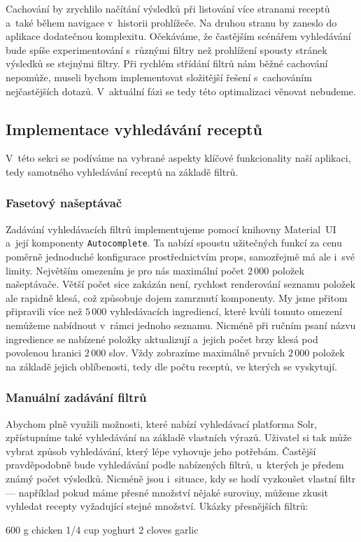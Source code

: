 Cachování by zrychlilo načítání výsledků při listování více stranami receptů a~také během navigace v~historii prohlížeče. Na druhou stranu by zaneslo do aplikace dodatečnou komplexitu. Očekáváme, že častějším scénářem vyhledávání bude spíše experimentování s~různými filtry než prohlížení spousty stránek výsledků se stejnými filtry. Při rychlém střídání filtrů nám běžné cachování nepomůže, museli bychom implementovat složitější řešení s~cachováním nejčastějších dotazů. V~aktuální fázi se tedy této optimalizaci věnovat nebudeme.

\subsection{Implementace vyhledávání receptů}

V~této sekci se podíváme na vybrané aspekty klíčové funkcionality naší aplikaci, tedy samotného vyhledávání receptů na základě filtrů.

\subsubsection{Fasetový našeptávač}

Zadávání vyhledávacích filtrů implementujeme pomocí knihovny Material~UI a~její komponenty \texttt{Autocomplete}. Ta nabízí spoustu užitečných funkcí za cenu poměrně jednoduché konfigurace prostřednictvím props, samozřejmě má ale i~své limity. Největším omezením je pro nás maximální počet $2\,000$ položek našeptávače. Větší počet sice zakázán není, rychlost renderování seznamu položek ale rapidně klesá, což způsobuje dojem zamrznutí komponenty. My jsme přitom připravili více než $5\,000$ vyhledávacích ingrediencí, které kvůli tomuto omezení nemůžeme nabídnout v~rámci jednoho seznamu. Nicméně při ručním psaní názvu ingredience se nabízené položky aktualizují a~jejich počet brzy klesá pod povolenou hranici $2\,000$ slov. Vždy zobrazíme maximálně prvních $2\,000$ položek na základě jejich oblíbenosti, tedy dle počtu receptů, ve kterých se vyskytují.

\subsubsection{Manuální zadávání filtrů}

Abychom plně využili možnosti, které nabízí vyhledávací platforma Solr, zpřístupníme také vyhledávání na základě vlastních výrazů. Uživatel si tak může vybrat způsob vyhledávání, který lépe vyhovuje jeho potřebám. Častější pravděpodobně bude vyhledávání podle nabízených filtrů, u~kterých je předem známý počet výsledků. Nicméně jsou i~situace, kdy se hodí vyzkoušet vlastní filtr --- například pokud máme přesné množství nějaké suroviny, můžeme zkusit vyhledat recepty vyžadující stejné množství. Ukázky přesnějších filtrů:
\begin{code}
600 g chicken
1/4 cup yoghurt
2 cloves garlic
\end{code}

